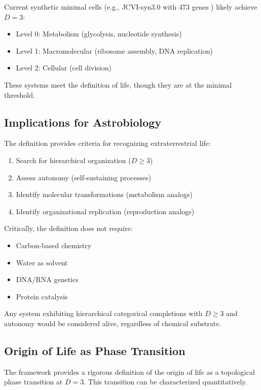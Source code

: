 \documentclass[11pt]{article}
\begin{document}
Current synthetic minimal cells (e.g., JCVI-syn3.0 with 473 genes \citep{Hutchison2016}) likely achieve $D = 3$:
\begin{itemize}
\item Level 0: Metabolism (glycolysis, nucleotide synthesis)
\item Level 1: Macromolecular (ribosome assembly, DNA replication)
\item Level 2: Cellular (cell division)
\end{itemize}

These systems meet the definition of life, though they are at the minimal threshold.

\subsection{Implications for Astrobiology}

The definition provides criteria for recognizing extraterrestrial life:

\begin{enumerate}
\item Search for hierarchical organization ($D \geq 3$)
\item Assess autonomy (self-sustaining processes)
\item Identify molecular transformations (metabolism analogs)
\item Identify organizational replication (reproduction analogs)
\end{enumerate}

Critically, the definition does not require:
\begin{itemize}
\item Carbon-based chemistry
\item Water as solvent
\item DNA/RNA genetics
\item Protein catalysis
\end{itemize}

Any system exhibiting hierarchical categorical completions with $D \geq 3$ and autonomy would be considered alive, regardless of chemical substrate.

\subsection{Origin of Life as Phase Transition}

The framework provides a rigorous definition of the origin of life as a topological phase transition at $D = 3$. This transition can be characterized quantitatively.
\end{document}
